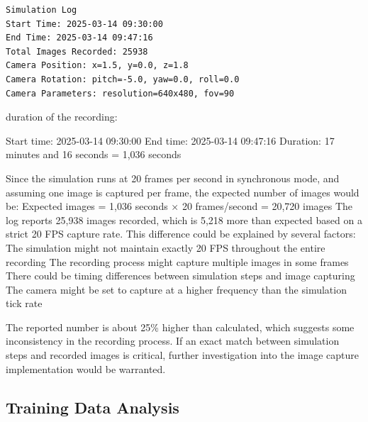 
\begin{verbatim}
Simulation Log
Start Time: 2025-03-14 09:30:00
End Time: 2025-03-14 09:47:16
Total Images Recorded: 25938
Camera Position: x=1.5, y=0.0, z=1.8
Camera Rotation: pitch=-5.0, yaw=0.0, roll=0.0
Camera Parameters: resolution=640x480, fov=90    
\end{verbatim}


duration of the recording:

Start time: 2025-03-14 09:30:00
End time: 2025-03-14 09:47:16
Duration: 17 minutes and 16 seconds = 1,036 seconds

Since the simulation runs at 20 frames per second in synchronous mode, and assuming one image is captured per frame, the expected number of images would be:
Expected images = 1,036 seconds × 20 frames/second = 20,720 images
The log reports 25,938 images recorded, which is 5,218 more than expected based on a strict 20 FPS capture rate.
This difference could be explained by several factors:
The simulation might not maintain exactly 20 FPS throughout the entire recording
The recording process might capture multiple images in some frames
There could be timing differences between simulation steps and image capturing
The camera might be set to capture at a higher frequency than the simulation tick rate

The reported number is about 25\% higher than calculated, which suggests some inconsistency in the recording process. If an exact match between simulation steps and recorded images is critical, further investigation into the image capture implementation would be warranted.


\subsection{Training Data Analysis}


